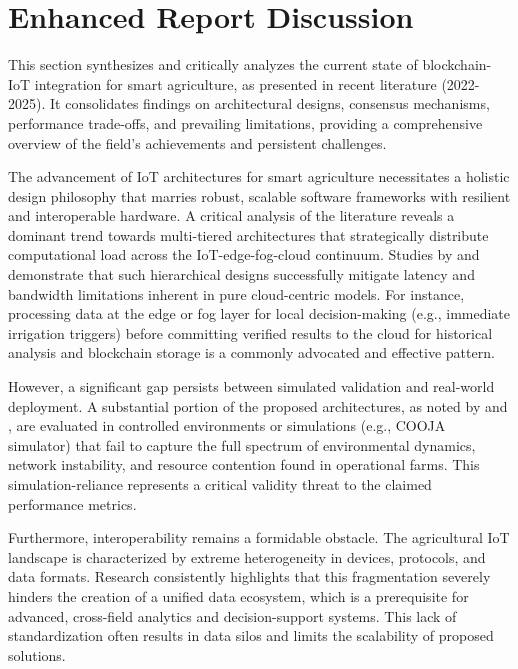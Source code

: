 \documentclass[12pt,onecolumn]{IEEEtran} %
\begin{document}
\section{Enhanced Report Discussion}\label{sec:enhanced-discussion}
\noindent This section synthesizes and critically analyzes the current state of blockchain-IoT integration for smart agriculture, as presented in recent literature (2022-2025). It consolidates findings on architectural designs, consensus mechanisms, performance trade-offs, and prevailing limitations, providing a comprehensive overview of the field's achievements and persistent challenges.

The advancement of IoT architectures for smart agriculture necessitates a holistic design philosophy that marries robust, scalable software frameworks with resilient and interoperable hardware. A critical analysis of the literature reveals a dominant trend towards multi-tiered architectures that strategically distribute computational load across the IoT-edge-fog-cloud continuum. Studies by \cite{akhter2022precisionagricultureusing} and \cite{atalla2023iotenabledprecisionagriculture} demonstrate that such hierarchical designs successfully mitigate latency and bandwidth limitations inherent in pure cloud-centric models. For instance, processing data at the edge or fog layer for local decision-making (e.g., immediate irrigation triggers) before committing verified results to the cloud for historical analysis and blockchain storage is a commonly advocated and effective pattern.

However, a significant gap persists between simulated validation and real-world deployment. A substantial portion of the proposed architectures, as noted by \cite{bayih2022utilizationofinternet} and \cite{atalla2023iotenabledprecisionagriculture}, are evaluated in controlled environments or simulations (e.g., COOJA simulator) that fail to capture the full spectrum of environmental dynamics, network instability, and resource contention found in operational farms. This simulation-reliance represents a critical validity threat to the claimed performance metrics.

Furthermore, interoperability remains a formidable obstacle. The agricultural IoT landscape is characterized by extreme heterogeneity in devices, protocols, and data formats. Research consistently highlights that this fragmentation \cite{bayih2022utilizationofinternet, bayih2022utilizationofinternet} severely hinders the creation of a unified data ecosystem, which is a prerequisite for advanced, cross-field analytics and decision-support systems. This lack of standardization often results in data silos and limits the scalability of proposed solutions.
\end{document}

